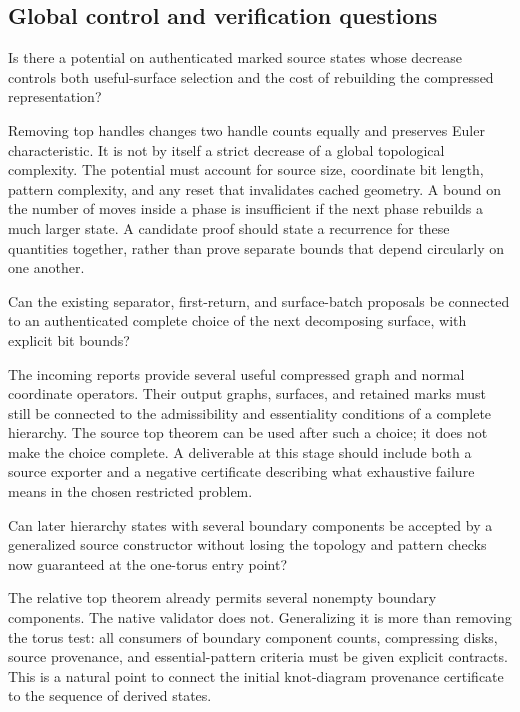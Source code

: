 \subsection{Global control and verification questions}

\begin{question}
Is there a potential on authenticated marked source states whose decrease
controls both useful-surface selection and the cost of rebuilding the
compressed representation?
\end{question}

Removing top handles changes two handle counts equally and preserves Euler
characteristic. It is not by itself a strict decrease of a global
topological complexity. The potential must account for source size,
coordinate bit length, pattern complexity, and any reset that invalidates
cached geometry. A bound on the number of moves inside a phase is
insufficient if the next phase rebuilds a much larger state. A candidate
proof should state a recurrence for these quantities together, rather than
prove separate bounds that depend circularly on one another.

\begin{question}
Can the existing separator, first-return, and surface-batch proposals be
connected to an authenticated complete choice of the next decomposing
surface, with explicit bit bounds?
\end{question}

The incoming reports provide several useful compressed graph and normal
coordinate operators. Their output graphs, surfaces, and retained marks
must still be connected to the admissibility and essentiality conditions
of a complete hierarchy. The source top theorem can be used after such a
choice; it does not make the choice complete. A deliverable at this stage
should include both a source exporter and a negative certificate describing
what exhaustive failure means in the chosen restricted problem.

\begin{question}
Can later hierarchy states with several boundary components be accepted
by a generalized source constructor without losing the topology and
pattern checks now guaranteed at the one-torus entry point?
\end{question}

The relative top theorem already permits several nonempty boundary
components. The native validator does not. Generalizing it is more than
removing the torus test: all consumers of boundary component counts,
compressing disks, source provenance, and essential-pattern criteria must
be given explicit contracts. This is a natural point to connect the
initial knot-diagram provenance certificate to the sequence of derived
states.


